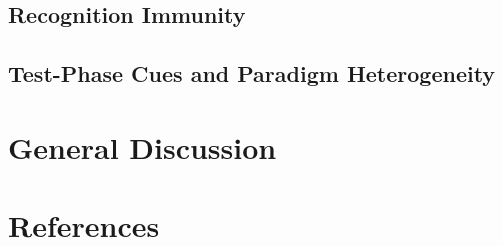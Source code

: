 \documentclass[
  man,
  floatsintext,
  longtable,
  nolmodern,
  notxfonts,
  notimes,
  draftfirst,
  colorlinks=true,linkcolor=blue,citecolor=blue,urlcolor=blue]{apa7}
\begin{document}
\subsection{Recognition Immunity}\label{recognition-immunity}

\subsection{Test-Phase Cues and Paradigm
Heterogeneity}\label{test-phase-cues-and-paradigm-heterogeneity}

\section{General Discussion}\label{general-discussion}

\section{References}\label{references}
\end{document}
